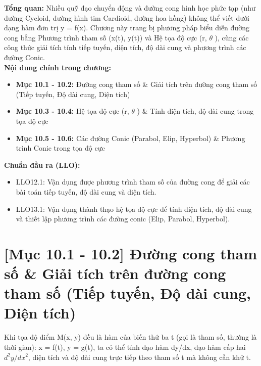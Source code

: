 \documentclass[11pt,a4paper,oneside]{book}
\begin{document}
\begin{tcolorbox}[colback=slate!5!white,colframe=slate!75!black,title={\textbf{Mục lục Chương 10 \& Chuẩn đầu ra (Buổi 12 - 13)}}]
\textbf{Tổng quan:} Nhiều quỹ đạo chuyển động và đường cong hình học phức tạp (như đường Cycloid, đường hình tim Cardioid, đường hoa hồng) không thể viết dưới dạng hàm đơn trị y = f(x). Chương này trang bị phương pháp biểu diễn đường cong bằng Phương trình tham số (x(t), y(t)) và Hệ tọa độ cực (r, $\theta$ ), cùng các công thức giải tích tính tiếp tuyến, diện tích, độ dài cung và phương trình các đường Conic.\\[6pt]
\textbf{Nội dung chính trong chương:}
\begin{itemize}[leftmargin=1.5em, itemsep=2pt]
  \item \textbf{Mục 10.1 - 10.2:} Đường cong tham số \& Giải tích trên đường cong tham số (Tiếp tuyến, Độ dài cung, Diện tích)
  \item \textbf{Mục 10.3 - 10.4:} Hệ tọa độ cực (r, $\theta$ ) \& Tính diện tích, độ dài cung trong tọa độ cực
  \item \textbf{Mục 10.5 - 10.6:} Các đường Conic (Parabol, Elip, Hyperbol) \& Phương trình Conic trong tọa độ cực
\end{itemize}
\textbf{Chuẩn đầu ra (LLO):}
\begin{itemize}[leftmargin=1.5em, itemsep=2pt]
  \item LLO12.1: Vận dụng được phương trình tham số của đường cong để giải các bài toán tiếp tuyến, độ dài cung và diện tích.
  \item LLO13.1: Vận dụng thành thạo hệ tọa độ cực để tính diện tích, độ dài cung và thiết lập phương trình các đường conic (Elip, Parabol, Hyperbol).
\end{itemize}
\end{tcolorbox}

\section{[Mục 10.1 - 10.2] Đường cong tham số \& Giải tích trên đường cong tham số (Tiếp tuyến, Độ dài cung, Diện tích)}
Khi tọa độ điểm M(x, y) đều là hàm của biến thứ ba t (gọi là tham số, thường là thời gian): x = f(t), y = g(t), ta có thể tính đạo hàm dy/dx, đạo hàm cấp hai $d^2y / dx^2$, diện tích và độ dài cung trực tiếp theo tham số t mà không cần khử t.
\end{document}
